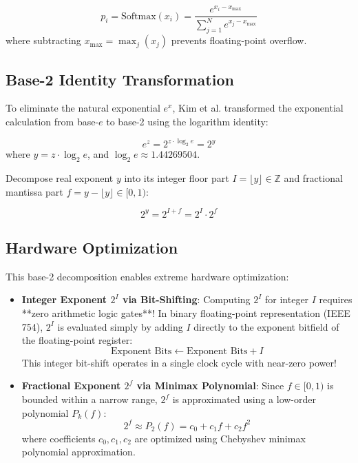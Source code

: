 \begin{equation}
p_i = \text{Softmax}(x_i) = \frac{e^{x_i - x_{\max}}}{\sum_{j=1}^N e^{x_j - x_{\max}}}
\end{equation}
where subtracting $x_{\max} = \max_j(x_j)$ prevents floating-point overflow.

\subsection{Base-2 Identity Transformation}
To eliminate the natural exponential $e^x$, Kim et al. transformed the exponential calculation from base-$e$ to base-2 using the logarithm identity:

\begin{equation}
e^z = 2^{z \cdot \log_2 e} = 2^y
\end{equation}
where $y = z \cdot \log_2 e$, and $\log_2 e \approx 1.44269504$.

Decompose real exponent $y$ into its integer floor part $I = \lfloor y \rfloor \in \mathbb{Z}$ and fractional mantissa part $f = y - \lfloor y \rfloor \in [0, 1)$:

\begin{equation}
2^y = 2^{I + f} = 2^I \cdot 2^f
\end{equation}

\subsection{Hardware Optimization}
This base-2 decomposition enables extreme hardware optimization:
\begin{itemize}[leftmargin=*]
    \item \textbf{Integer Exponent $2^I$ via Bit-Shifting}: Computing $2^I$ for integer $I$ requires **zero arithmetic logic gates**! In binary floating-point representation (IEEE 754), $2^I$ is evaluated simply by adding $I$ directly to the exponent bitfield of the floating-point register:
    $$\text{Exponent Bits} \leftarrow \text{Exponent Bits} + I$$
    This integer bit-shift operates in a single clock cycle with near-zero power!
    
    \item \textbf{Fractional Exponent $2^f$ via Minimax Polynomial}: Since $f \in [0, 1)$ is bounded within a narrow range, $2^f$ is approximated using a low-order polynomial $P_k(f)$:
    \begin{equation}
    2^f \approx P_2(f) = c_0 + c_1 f + c_2 f^2
    \end{equation}
    where coefficients $c_0, c_1, c_2$ are optimized using Chebyshev minimax polynomial approximation.
\end{itemize}

